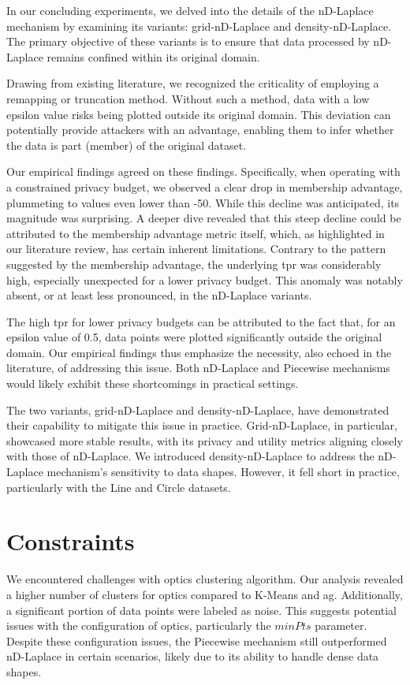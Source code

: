In our concluding experiments, we delved into the details of the nD-Laplace mechanism by examining its variants: grid-nD-Laplace and density-nD-Laplace. The primary objective of these variants is to ensure that data processed by nD-Laplace remains confined within its original domain.

Drawing from existing literature, we recognized the criticality of employing a remapping or truncation method. Without such a method, data with a low epsilon value risks being plotted outside its original domain. This deviation can potentially provide attackers with an advantage, enabling them to infer whether the data is part (member) of the original dataset.

Our empirical findings agreed on these findings. Specifically, when operating with a constrained privacy budget, we observed a clear drop in membership advantage, plummeting to values even lower than -50. While this decline was anticipated, its magnitude was surprising. A deeper dive revealed that this steep decline could be attributed to the membership advantage metric itself, which, as highlighted in our literature review, has certain inherent limitations. Contrary to the pattern suggested by the membership advantage, the underlying \gls{tpr} was considerably high, especially unexpected for a lower privacy budget. This anomaly was notably absent, or at least less pronounced, in the nD-Laplace variants. 

The high \gls{tpr} for lower privacy budgets can be attributed to the fact that, for an epsilon value of 0.5, data points were plotted significantly outside the original domain. Our empirical findings thus emphasize the necessity, also echoed in the literature, of addressing this issue. Both nD-Laplace and Piecewise mechanisms would likely exhibit these shortcomings in practical settings.

The two variants, grid-nD-Laplace and density-nD-Laplace, have demonstrated their capability to mitigate this issue in practice. Grid-nD-Laplace, in particular, showcased more stable results, with its privacy and utility metrics aligning closely with those of nD-Laplace. We introduced density-nD-Laplace to address the nD-Laplace mechanism's sensitivity to data shapes. However, it fell short in practice, particularly with the Line and Circle datasets.

\section{Constraints}
We encountered challenges with \gls{optics} clustering algorithm.
Our analysis revealed a higher number of clusters for \gls{optics} compared to K-Means and \gls{ag}. Additionally, a significant portion of data points were labeled as noise. This suggests potential issues with the configuration of \gls{optics}, particularly the $minPts$ parameter. Despite these configuration issues, the Piecewise mechanism still outperformed nD-Laplace in certain scenarios, likely due to its ability to handle dense data shapes.
